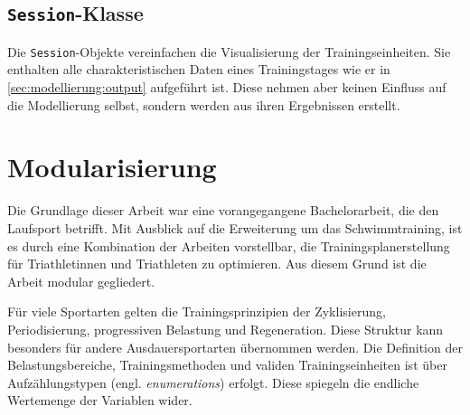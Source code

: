 \subsection{\texttt{Session}-Klasse}
Die \texttt{Session}-Objekte vereinfachen die Visualisierung der Trainingseinheiten. Sie enthalten alle charakteristischen Daten eines Trainingstages wie er in \ref{sec:modellierung:output} aufgeführt ist. Diese nehmen aber keinen Einfluss auf die Modellierung selbst, sondern werden aus ihren Ergebnissen erstellt.

\section{Modularisierung}
Die Grundlage dieser Arbeit war eine vorangegangene Bachelorarbeit, die den Laufsport betrifft. Mit Ausblick auf die Erweiterung um das Schwimmtraining, ist es durch eine Kombination der Arbeiten vorstellbar, die Trainingsplanerstellung für Triathletinnen und Triathleten zu optimieren. Aus diesem Grund ist die Arbeit modular gegliedert. \par
Für viele Sportarten gelten die Trainingsprinzipien der Zyklisierung, Periodisierung, progressiven Belastung und Regeneration. Diese Struktur kann besonders für andere Ausdauersportarten übernommen werden. Die Definition der Belastungsbereiche, Trainingsmethoden und validen Trainingseinheiten ist über Aufzählungstypen (engl. \textit{enumerations}) erfolgt. Diese spiegeln die endliche Wertemenge der Variablen wider.
